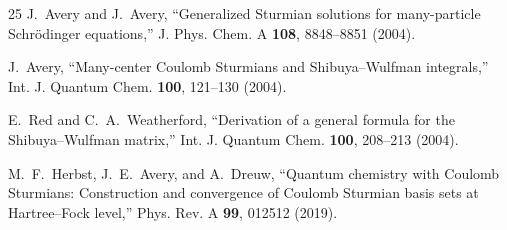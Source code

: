 \documentclass[aps,pra,twocolumn,superscriptaddress,longbibliography]{revtex4-2}
\theoremstyle{remark}
\theoremstyle{plain}
\begin{document}
\begin{thebibliography}{25}
J.~Avery and J.~Avery,
``Generalized Sturmian solutions for many-particle Schr\"odinger
equations,''
J. Phys. Chem. A \textbf{108}, 8848--8851 (2004).

J.~Avery,
``Many-center Coulomb Sturmians and Shibuya--Wulfman integrals,''
Int. J. Quantum Chem. \textbf{100}, 121--130 (2004).

E.~Red and C.~A.~Weatherford,
``Derivation of a general formula for the Shibuya--Wulfman matrix,''
Int. J. Quantum Chem. \textbf{100}, 208--213 (2004).

M.~F.~Herbst, J.~E.~Avery, and A.~Dreuw,
``Quantum chemistry with Coulomb Sturmians: Construction and convergence
of Coulomb Sturmian basis sets at Hartree--Fock level,''
Phys. Rev. A \textbf{99}, 012512 (2019).

\end{thebibliography}
\end{document}
